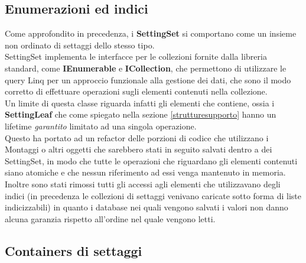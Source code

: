 \documentclass[\main/tesi.tex]{subfiles}
\begin{document}
\subsection{Enumerazioni ed indici}

Come approfondito in precedenza, i \textbf{SettingSet} si comportano come un insieme non ordinato di settaggi dello stesso tipo.\\
SettingSet implementa le interfacce per le collezioni fornite dalla libreria standard, come \textbf{IEnumerable} e \textbf{ICollection}, che permettono di utilizzare le query Linq per un approccio funzionale alla gestione dei dati, che sono il modo corretto di effettuare operazioni sugli elementi contenuti nella collezione.\\
Un limite di questa classe riguarda infatti gli elementi che contiene, ossia i \textbf{SettingLeaf} che come spiegato nella sezione \ref{strutturesupporto} hanno un lifetime \textit{garantito} limitato ad una singola operazione.\\
Questo ha portato ad un refactor delle porzioni di codice che utilizzano i Montaggi o altri oggetti che sarebbero stati in seguito salvati dentro a dei SettingSet, in modo che tutte le operazioni che riguardano gli elementi contenuti siano atomiche e che nessun riferimento ad essi venga mantenuto in memoria.\\
Inoltre sono stati rimossi tutti gli accessi agli elementi che utilizzavano degli indici (in precedenza le collezioni di settaggi venivano caricate sotto forma di liste indicizzabili) in quanto i database nei quali vengono salvati i valori non danno alcuna garanzia rispetto all'ordine nel quale vengono letti.

\subsection{Containers di settaggi}
\end{document}
